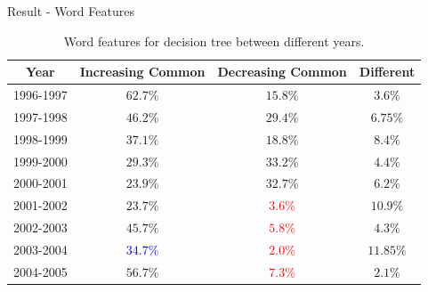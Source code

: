 \documentclass{beamer}
\begin{document}
\begin{frame}{Result - Word Features}

  \begin{table}[H]
    \centering
    \begin{tabular}{|c|c|c|c|}
      \hline
      Year      & Increasing Common          & Decreasing Common        & Different \\
      \hline
      1996-1997 & $62.7\%$                   & $15.8\%$                 & $3.6\%$   \\
      \hline
      1997-1998 & $46.2\%$                   & $29.4\%$                 & $6.75\%$  \\
      \hline
      1998-1999 & $37.1\%$                   & $18.8\%$                 & $8.4\%$   \\
      \hline
      1999-2000 & $29.3\%$                   & $33.2\%$                 & $4.4\%$   \\
      \hline
      2000-2001 & $23.9\%$                   & $32.7\%$                 & $6.2\%$   \\
      \hline
      2001-2002 & $23.7\%$                   & \textcolor{red}{$3.6\%$} & $10.9\%$  \\
      \hline
      2002-2003 & $45.7\%$                   & \textcolor{red}{$5.8\%$} & $4.3\%$   \\
      \hline
      2003-2004 & \textcolor{blue}{$34.7\%$} & \textcolor{red}{$2.0\%$} & $11.85\%$ \\
      \hline
      2004-2005 & $56.7\%$                   & \textcolor{red}{$7.3\%$} & $2.1\%$   \\
      \hline
    \end{tabular}
    \caption{Word features for decision tree between different years.}
  \end{table}

\end{frame}
\end{document}
